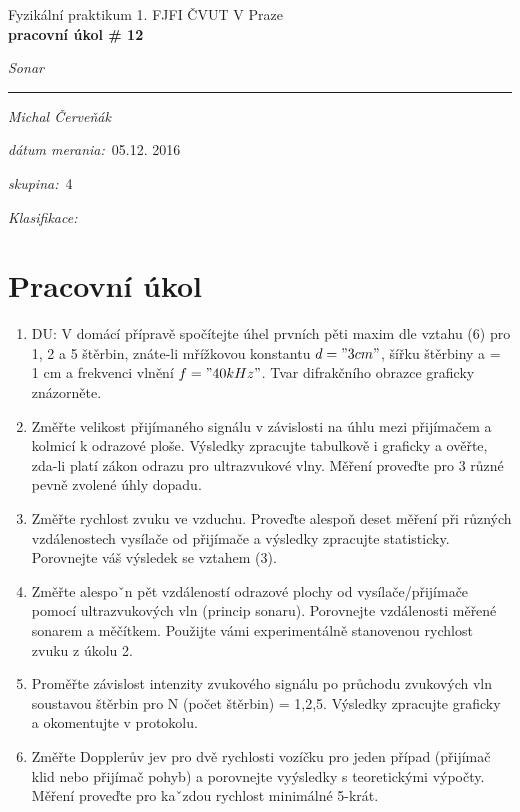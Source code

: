 \documentclass[a4paper,10pt]{article}
\begin{document}
\def\mean#1{\left< #1 \right>}
\noindent
{\large Fyzikální praktikum 1.} \hfil {\large FJFI ČVUT V Praze}\\
\noindent
{\large\textbf{pracovní úkol \# 12}}
\begin{center}
{\large\textit{Sonar}}
\end{center}
\noindent
\rule{\textwidth}{1px}
\vspace{\baselineskip}

\emph{Michal Červeňák}
\par
\vspace{\baselineskip}
\begin{minipage}[l]{0.5\textwidth}%
\textit{dátum merania:}~05.12. 2016\\%
\par%
\noindent%
\textit{skupina:}~4\\%
\par%
\noindent%
\textit{Klasifikace:}\dotfill\\%
\end{minipage}

\section{Pracovní úkol}

\begin{enumerate}
\item DU: V domácí přípravě spočítejte úhel prvních pěti maxim dle vztahu (6) pro 1,
2 a 5 štěrbin, znáte-li mřížkovou konstantu $d = "3 cm"$, šířku štěrbiny a = 1 cm
a frekvenci vlnění $f = "40 kHz"$. Tvar difrakčního obrazce graficky znázorněte.
\item  Změřte velikost přijímaného signálu v závislosti na úhlu mezi přijímačem a kolmicí k odrazové
ploše. Výsledky zpracujte tabulkově i graficky a ověřte, zda-li platí zákon odrazu pro ultrazvukové
vlny. Měření proveďte pro 3 různé pevně zvolené úhly dopadu.
\item  Změřte rychlost zvuku ve vzduchu. Proveďte alespoň deset měření při různých vzdálenostech
vysílače od přijímače a výsledky zpracujte statisticky. Porovnejte váš výsledek se vztahem (3).
\item  Změřte alespoˇn pět vzdáleností odrazové plochy od vysílače/přijímače pomocí ultrazvukových
vln (princip sonaru). Porovnejte vzdálenosti měřené sonarem a měčítkem. Použijte vámi experimentálně
stanovenou rychlost zvuku z úkolu 2.
\item  Proměřte závislost intenzity zvukového signálu po průchodu zvukových vln soustavou štěrbin
pro N (počet štěrbin) = 1,2,5. Výsledky zpracujte graficky a okomentujte v protokolu.
\item Změřte Dopplerův jev pro dvě rychlosti vozíčku pro jeden případ (přijímač klid nebo přijímač
pohyb) a porovnejte vyýsledky s teoretickými výpočty. Měření proveďte pro kaˇzdou rychlost
minimálné 5-krát.
\end{enumerate}
\end{document}
